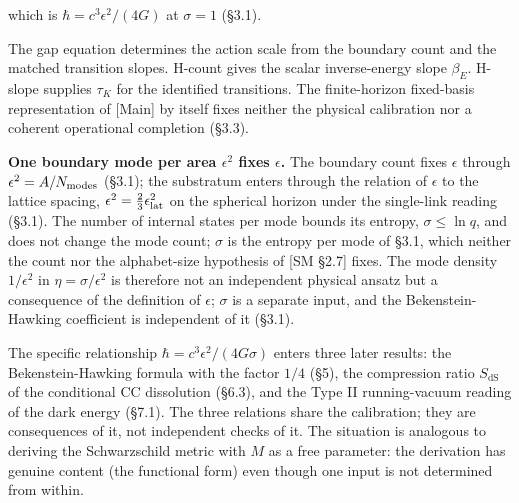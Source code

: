 \documentclass[
]{article}
\begin{document}
which is \(\hbar = c^3 \epsilon^2/(4G)\) at \(\sigma = 1\) (§3.1).

The gap equation determines the action scale from the boundary count and
the matched transition slopes. H-count gives the scalar inverse-energy
slope \(\beta_E\). H-slope supplies \(\tau_K\) for the identified
transitions. The finite-horizon fixed-basis representation of {[}Main{]}
by itself fixes neither the physical calibration nor a coherent
operational completion (§3.3).

\textbf{One boundary mode per area \(\epsilon^2\) fixes \(\epsilon\).}
The boundary count fixes \(\epsilon\) through
\(\epsilon^2 = A/N_{\rm modes}\) (§3.1); the substratum enters through
the relation of \(\epsilon\) to the lattice spacing,
\(\epsilon^2 = \tfrac23\epsilon_{\rm lat}^2\) on the spherical horizon
under the single-link reading (§3.1). The number of internal states per
mode bounds its entropy, \(\sigma \leq \ln q\), and does not change the
mode count; \(\sigma\) is the entropy per mode of §3.1, which neither
the count nor the alphabet-size hypothesis of {[}SM §2.7{]} fixes. The
mode density \(1/\epsilon^2\) in \(\eta = \sigma/\epsilon^2\) is
therefore not an independent physical ansatz but a consequence of the
definition of \(\epsilon\); \(\sigma\) is a separate input, and the
Bekenstein-Hawking coefficient is independent of it (§3.1).

The specific relationship \(\hbar = c^3\epsilon^2/(4G\sigma)\) enters
three later results: the Bekenstein-Hawking formula with the factor
\(1/4\) (§5), the compression ratio \(S_{\text{dS}}\) of the conditional
CC dissolution (§6.3), and the Type II running-vacuum reading of the
dark energy (§7.1). The three relations share the calibration; they are
consequences of it, not independent checks of it. The situation is
analogous to deriving the Schwarzschild metric with \(M\) as a free
parameter: the derivation has genuine content (the functional form) even
though one input is not determined from within.
\end{document}

